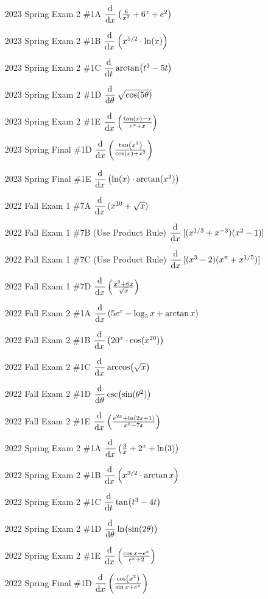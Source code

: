 \documentclass[10pt]{scrartcl}
\theoremstyle{definition}
\begin{document}
\begin{enumerate}
\item[2023 Spring Exam 2 \#1A] $\dod{}{x}\left( \frac{6}{x^2} + 6^x + e^2 \right)$
\item[2023 Spring Exam 2 \#1B] $\dod{}{x}\left( x^{5/2} \cdot \ln(x) \right)$
\item[2023 Spring Exam 2 \#1C] $\dod{}{t} \arctan(t^3-5t)$
\item[2023 Spring Exam 2 \#1D] $\dod{}{\theta} \sqrt{\cos(5\theta)}$
\item[2023 Spring Exam 2 \#1E] $\dod{}{x}\left( \frac{\tan(x) - x}{e^x+x} \right)$
\item[2023 Spring Final \#1D] $\dod{}{x} \left( \frac{\tan(x^2)}{\cos(x)+x^3} \right)$
\item[2023 Spring Final \#1E] $\dod{}{x}\left( \ln(x) \cdot \arctangent(x^3) \right)$
\item[2022 Fall Exam 1 \#7A] $\dod{}{x} (x^{10}+\sqrt{x})$
\item[2022 Fall Exam 1 \#7B] (Use Product Rule) $\dod{}{x} [(x^{1/3}+x^{-3})(x^2-1)]$
\item[2022 Fall Exam 1 \#7C] (Use Product Rule) $\dod{}{x} [(x^3-2)(x^\pi+x^{1/5})]$
\item[2022 Fall Exam 1 \#7D] $\dod{}{x} \left( \frac{x^2+6x}{\sqrt{x}} \right)$
\item[2022 Fall Exam 2 \#1A] $\dod{}{x}\left( 5e^x - \log_5 x + \arctan x \right)$
\item[2022 Fall Exam 2 \#1B] $\dod{}{x}\left( 20^x \cdot \cosine(x^{20}) \right)$
\item[2022 Fall Exam 2 \#1C] $\dod{}{x} \arccos(\sqrt{x})$
\item[2022 Fall Exam 2 \#1D] $\dod{}{\theta} \csc(\sine(\theta^2))$
\item[2022 Fall Exam 2 \#1E] $\dod{}{x} \left( \frac{e^{2x}+\ln(2x+1)}{x^6-7x} \right)$
\item[2022 Spring Exam 2 \#1A] $\dod{}{x}\left( \frac 3x + 2^x + \ln(3) \right)$
\item[2022 Spring Exam 2 \#1B] $\dod{}{x}\left( x^{3/2} \cdot \arctan x\right)$
\item[2022 Spring Exam 2 \#1C] $\dod{}{t} \tan(t^3-4t)$
\item[2022 Spring Exam 2 \#1D] $\dod{}{\theta} \ln(\sin(2\theta))$
\item[2022 Spring Exam 2 \#1E] $\dod{}{x} \left( \frac{\cos x- e^x}{e^x+2} \right)$
\item[2022 Spring Final \#1D] $\dod{}{x} \left( \frac{\cos(x^2)}{\sin x + e^x} \right)$

\end{enumerate}
\end{document}
